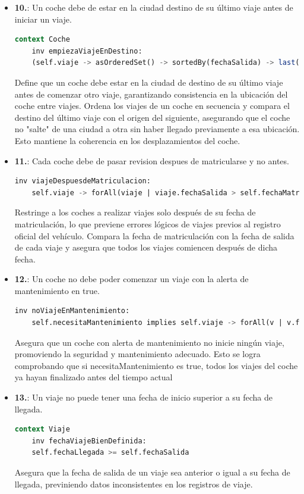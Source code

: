 \documentclass[12pt.a4paper]{article}
\begin{document}
\begin{itemize}
    \item \textbf{10.}: Un coche debe de estar en la ciudad destino de su último viaje antes de iniciar un viaje.
    \begin{lstlisting}[style = useEspecifico,language=SQL]
  context Coche
    inv empiezaViajeEnDestino:
    (self.viaje -> asOrderedSet() -> sortedBy(fechaSalida) -> last()).recorrido.destino = self.ciudad
    \end{lstlisting}
     Define que un coche debe estar en la ciudad de destino de su último viaje antes de comenzar otro viaje, garantizando consistencia en la ubicación del coche entre viajes.
     Ordena los viajes de un coche en secuencia y compara el destino del último viaje con el origen del siguiente, asegurando que el coche no "salte" de una ciudad a otra sin haber llegado previamente a esa ubicación. Esto mantiene la coherencia en los desplazamientos del coche.
     
    \item \textbf{11.}: Cada coche debe de pasar revision despues de matricularse y no antes.
    \begin{lstlisting}[style = useEspecifico,language=SQL]
    inv viajeDespuesdeMatriculacion:
    self.viaje -> forAll(viaje | viaje.fechaSalida > self.fechaMatriculacion)    
    \end{lstlisting}
    Restringe a los coches a realizar viajes solo después de su fecha de matriculación, lo que previene errores lógicos de viajes previos al registro oficial del vehículo.
    Compara la fecha de matriculación con la fecha de salida de cada viaje y asegura que todos los viajes comiencen después de dicha fecha.
    
    \item \textbf{12.}: Un coche no debe poder comenzar un viaje con la alerta de mantenimiento en true.
    \begin{lstlisting}[style = useEspecifico,language=SQL]
    inv noViajeEnMantenimiento:
    self.necesitaMantenimiento implies self.viaje -> forAll(v | v.fechaLlegada < self.clock.NOW)   
    \end{lstlisting}
    Asegura que un coche con alerta de mantenimiento no inicie ningún viaje, promoviendo la seguridad y mantenimiento adecuado.
    Esto se logra comprobando que si necesitaMantenimiento es true, todos los viajes del coche ya hayan finalizado antes del tiempo actual 
    
    \item \textbf{13.}: Un viaje no puede tener una fecha de inicio superior a su fecha de llegada.
    \begin{lstlisting}[style = useEspecifico,language=SQL]
context Viaje
    inv fechaViajeBienDefinida:
    self.fechaLlegada >= self.fechaSalida  
    \end{lstlisting}
    Asegura que la fecha de salida de un viaje sea anterior o igual a su fecha de llegada, previniendo datos inconsistentes en los registros de viaje.
\end{itemize}
\end{document}
